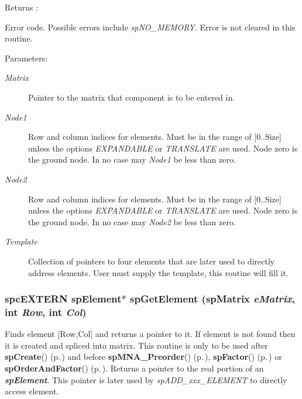 \begin{Desc}
\item[Returns :]\par
 Error code. Possible errors include {\em sp\-NO\_\-MEMORY}. Error is not cleared in this routine.\end{Desc}
\begin{Desc}
\item[Parameters: ]\par
\begin{description}
\item[{\em 
Matrix}]Pointer to the matrix that component is to be entered in. \item[{\em 
Node1}]Row and column indices for elements. Must be in the range of [0..Size] unless the options {\em EXPANDABLE} or {\em TRANSLATE} are used. Node zero is the ground node. In no case may {\em Node1} be less than zero. \item[{\em 
Node2}]Row and column indices for elements. Must be in the range of [0..Size] unless the options {\em EXPANDABLE} or {\em TRANSLATE} are used. Node zero is the ground node. In no case may {\em Node2} be less than zero. \item[{\em 
Template}]Collection of pointers to four elements that are later used to directly address elements. User must supply the template, this routine will fill it. \end{description}
\end{Desc}
\subsubsection{\setlength{\rightskip}{0pt plus 5cm}spc\-EXTERN {\bf sp\-Element}$\ast$ sp\-Get\-Element ({\bf sp\-Matrix} {\em e\-Matrix}, int {\em Row}, int {\em Col})}\label{spMatrix_8h_a36}


Finds element [Row,Col] and returns a pointer to it. If element is not found then it is created and spliced into matrix. This routine is only to be used after {\bf sp\-Create}() {\rm (p.\,\pageref{spMatrix_8h_a24})} and before {\bf sp\-MNA\_\-Preorder}() {\rm (p.\,\pageref{spMatrix_8h_a44})}, {\bf sp\-Factor}() {\rm (p.\,\pageref{spMatrix_8h_a30})} or {\bf sp\-Order\-And\-Factor}() {\rm (p.\,\pageref{spMatrix_8h_a46})}. Returns a pointer to the real portion of an {\em {\bf sp\-Element}}. This pointer is later used by {\em sp\-ADD\_\-xxx\_\-ELEMENT} to directly access element.

